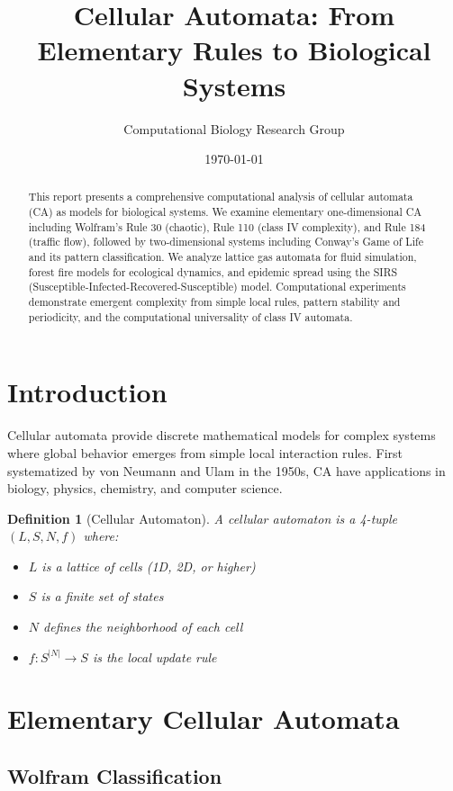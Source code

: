\documentclass[a4paper, 11pt]{article}
\title{Cellular Automata: From Elementary Rules to Biological Systems}
\author{Computational Biology Research Group}
\date{\today}
\newtheorem{definition}{Definition}[section]
\begin{document}
\maketitle

\begin{abstract}
This report presents a comprehensive computational analysis of cellular automata (CA) as
models for biological systems. We examine elementary one-dimensional CA including Wolfram's
Rule 30 (chaotic), Rule 110 (class IV complexity), and Rule 184 (traffic flow), followed
by two-dimensional systems including Conway's Game of Life and its pattern classification.
We analyze lattice gas automata for fluid simulation, forest fire models for ecological
dynamics, and epidemic spread using the SIRS (Susceptible-Infected-Recovered-Susceptible)
model. Computational experiments demonstrate emergent complexity from simple local rules,
pattern stability and periodicity, and the computational universality of class IV automata.
\end{abstract}

\section{Introduction}

Cellular automata provide discrete mathematical models for complex systems where global
behavior emerges from simple local interaction rules. First systematized by von Neumann
and Ulam in the 1950s, CA have applications in biology, physics, chemistry, and computer
science.

\begin{definition}[Cellular Automaton]
A cellular automaton is a 4-tuple $(L, S, N, f)$ where:
\begin{itemize}
\item $L$ is a lattice of cells (1D, 2D, or higher)
\item $S$ is a finite set of states
\item $N$ defines the neighborhood of each cell
\item $f: S^{|N|} \to S$ is the local update rule
\end{itemize}
\end{definition}

\section{Elementary Cellular Automata}

\subsection{Wolfram Classification}
\end{document}
